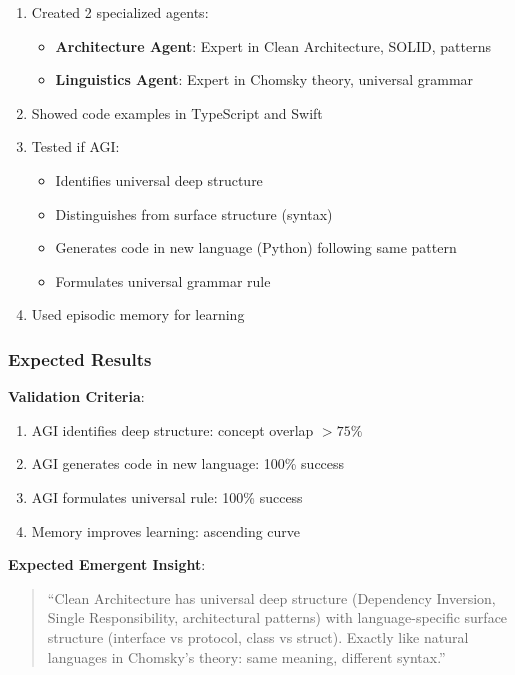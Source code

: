 \documentclass[11pt]{article}
\begin{document}
\begin{enumerate}
    \item Created 2 specialized agents:
    \begin{itemize}
        \item \textbf{Architecture Agent}: Expert in Clean Architecture, SOLID, patterns
        \item \textbf{Linguistics Agent}: Expert in Chomsky theory, universal grammar
    \end{itemize}

    \item Showed code examples in TypeScript and Swift

    \item Tested if AGI:
    \begin{itemize}
        \item Identifies universal deep structure
        \item Distinguishes from surface structure (syntax)
        \item Generates code in new language (Python) following same pattern
        \item Formulates universal grammar rule
    \end{itemize}

    \item Used episodic memory for learning
\end{enumerate}

\subsubsection{Expected Results}

\textbf{Validation Criteria}:
\begin{enumerate}
    \item AGI identifies deep structure: concept overlap $> 75\%$
    \item AGI generates code in new language: 100\% success
    \item AGI formulates universal rule: 100\% success
    \item Memory improves learning: ascending curve
\end{enumerate}

\textbf{Expected Emergent Insight}:
\begin{quote}
``Clean Architecture has universal deep structure (Dependency Inversion, Single Responsibility, architectural patterns) with language-specific surface structure (interface vs protocol, class vs struct). Exactly like natural languages in Chomsky's theory: same meaning, different syntax.''
\end{quote}
\end{document}
